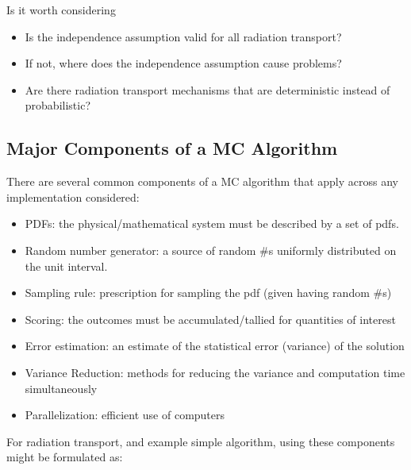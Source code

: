 \documentclass[12pt]{article}
\begin{document}
Is it worth considering

\begin{itemize}
  \item Is the independence assumption valid for all radiation transport?
  \item If not, where does the independence assumption cause problems?
  \item Are there radiation transport mechanisms that are deterministic instead of probabilistic?
\end{itemize}

\subsection*{Major Components of a MC Algorithm}

There are several common components of a MC algorithm that apply across any implementation considered:

\begin{itemize}
  \item PDFs: the physical/mathematical system must be described by a
set of pdfs.
  \item Random number generator: a source of random \#s uniformly
distributed on the unit interval.
  \item Sampling rule: prescription for sampling the pdf (given having
random \#s)
  \item Scoring: the outcomes must be accumulated/tallied for quantities
of interest
  \item Error estimation: an estimate of the statistical error (variance) of
the solution
  \item Variance Reduction: methods for reducing the variance and
computation time simultaneously
  \item Parallelization: efficient use of computers
\end{itemize}

For radiation transport, and example simple algorithm, using these components might be formulated as:
\end{document}
